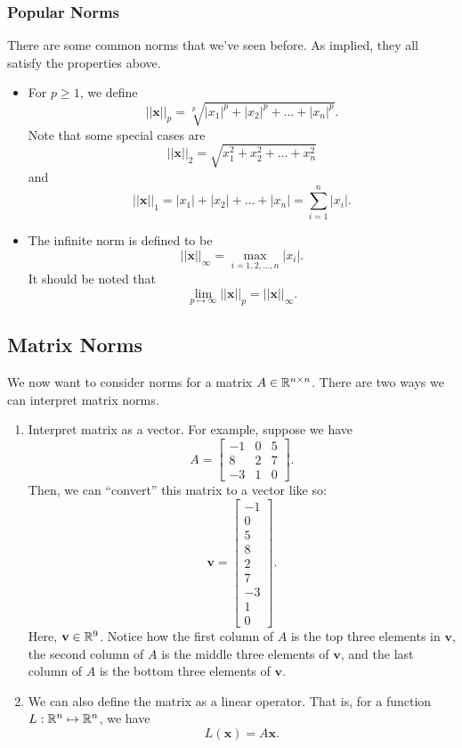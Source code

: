 \documentclass[letterpaper]{article}
\newcommand{\0}{\mathbf{0}}
\newcommand{\x}{\mathbf{x}}
\newcommand{\vv}{\mathbf{v}}
\begin{document}
\subsubsection{Popular Norms}
There are some common norms that we've seen before. As implied, they all satisfy the properties above. 
\begin{itemize}
    \item For $p \geq 1$, we define 
    \[||\x||_p = \sqrt[p]{|x_1|^p + |x_2|^p + \hdots + |x_n|^p}.\]
    Note that some special cases are 
    \[||\x||_2 = \sqrt{x_1^2 + x_2^2 + \hdots + x_n^2}\]
    and 
    \[||\x||_1 = |x_1| + |x_2| + \hdots + |x_n| = \sum_{i = 1}^{n} |x_i|.\]

    \item The infinite norm is defined to be \[||\x||_{\infty} = \max_{i = 1, 2, \hdots, n} |x_i|.\] It should be noted that \[\lim_{p \mapsto \infty} ||\x||_p = ||\x||_{\infty}.\]
\end{itemize}

\subsection{Matrix Norms}
We now want to consider norms for a matrix $A \in \mathbb{R}^{n \times n}$. There are two ways we can interpret matrix norms.
\begin{enumerate}
    \item Interpret matrix as a vector. For example, suppose we have \[A = \begin{bmatrix}
        -1 & 0 & 5 \\ 8 & 2 & 7 \\ -3 & 1 & 0
    \end{bmatrix}.\] Then, we can ``convert'' this matrix to a vector like so: \[\vv = \begin{bmatrix}
        -1 \\ 0 \\ 5 \\ 8 \\ 2 \\ 7 \\ -3 \\ 1 \\ 0
    \end{bmatrix}.\] Here, $\vv \in \R^9$. Notice how the first column of $A$ is the top three elements in $\vv$, the second column of $A$ is the middle three elements of $\vv$, and the last column of $A$ is the bottom three elements of $\vv$. 

    \item We can also define the matrix as a linear operator. That is, for a function $L: \mathbb{R}^n \mapsto \mathbb{R}^n$, we have \[L(\x) = A\x.\]
\end{enumerate}
\end{document}
